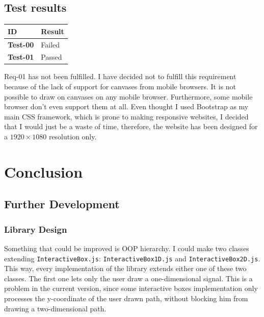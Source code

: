 \documentclass{article}
\begin{document}
\subsection{Test results}

\bgroup{}
\def\arraystretch{1.25}
\begin{center}
    \begin{tabular}{ |l|l| }
        \hline
        \textbf{ID} & Result \\
        \hline
        \textbf{Test-00} & \color{red} Failed \\
        \hline
        \textbf{Test-01} & \color{darkgreen} Passed \\
        \hline
    \end{tabular}
\end{center}
\egroup{}

Req-01 has not been fulfilled. I have decided not to fulfill this requirement because of the lack
of support for canvases from mobile browsers. It is not possible to draw on canvases on any mobile
browser. Furthermore, some mobile browser don't even support them at all.
Even thought I used Bootstrap as my main CSS framework, which is prone to making responsive websites,
I decided that I would just be a waste of time, therefore, the website has been designed for a \(1920\times1080\) resolution only.

\pagebreak

\section{Conclusion}

\subsection{Further Development}

\subsubsection{Library Design}

Something that could be improved is OOP hierarchy. I could make
two classes extending \texttt{InteractiveBox.js}: \texttt{InteractiveBox1D.js} and
\texttt{InteractiveBox2D.js}. This way, every implementation of the library extends either
one of these two classes. The first one lets only the user draw a one-dimensional signal.
This is a problem in the current version, since some interactive boxes implementation only processes
the y-coordinate of the user drawn path, without blocking him from drawing a two-dimensional path.
\end{document}
